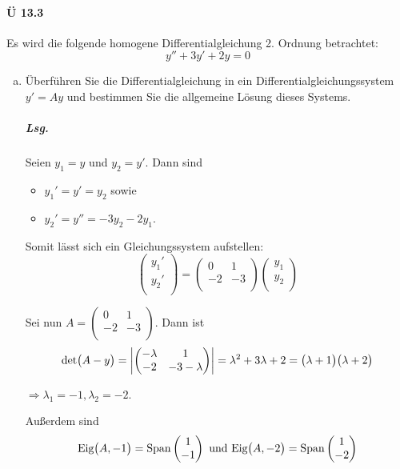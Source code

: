 \documentclass{scrreprt}
\begin{document}
\paragraph{Ü 13.3} Es wird die folgende homogene Differentialgleichung 2. Ordnung
betrachtet:
\[
  y'' + 3y' + 2y = 0
\]
\begin{enumerate}[(a)]
\item Überführen Sie die Differentialgleichung in ein
  Differentialgleichungssystem $y' = Ay$ und bestimmen Sie die allgemeine
  Lösung dieses Systems.

  \subparagraph{Lsg.} Seien $y_1 = y$ und $y_2 = y'$.
  Dann sind
  \begin{itemize}
  \item $y_1' = y' = y_2$ sowie
  \item $y_2' = y'' = -3y_2 - 2y_1$.
  \end{itemize}
  Somit lässt sich ein Gleichungssystem aufstellen:
  \[
    \begin{pmatrix}
      y_1' \\
      y_2' \\
    \end{pmatrix} = \begin{pmatrix}
      0  & 1  \\
      -2 & -3 \\
    \end{pmatrix} \begin{pmatrix}
      y_1 \\
      y_2 \\
    \end{pmatrix}
  \]

  Sei nun $A = \begin{pmatrix}
    0  & 1  \\
    -2 & -3 \\
  \end{pmatrix}$.
  Dann ist
  \[
    \text{det}\qty\big(A - y) = \abs{
      \begin{pmatrix}
        -\lambda & 1            \\
        -2       & -3 - \lambda \\
      \end{pmatrix}
    } = \lambda^2 + 3\lambda + 2
    = \qty\big(\lambda + 1)\qty\big(\lambda + 2)
  \]

  $\Rightarrow \lambda_1 = -1, \lambda_2 = -2$.

  Außerdem sind
  \[
    \text{Eig}\qty\big(A, -1) = \text{Span}\begin{pmatrix}
      1  \\
      -1 \\
    \end{pmatrix} \text{ und } \text{Eig}\qty\big(A, -2) = \text{Span}\begin{pmatrix}
      1  \\
      -2 \\
    \end{pmatrix}
  \]


\end{enumerate}
\end{document}
